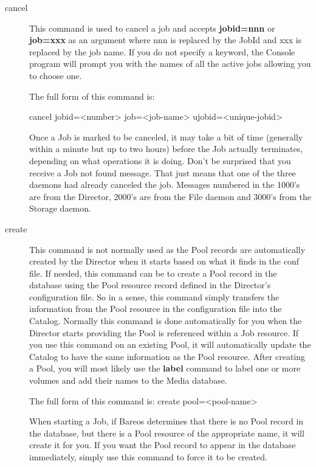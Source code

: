 \begin{description}
\item [cancel]
   This command is used to cancel a job and accepts {\bf jobid=nnn} or {\bf
   job=xxx} as an argument where nnn is replaced by the JobId and xxx is
   replaced by the job name.  If you do not specify a keyword, the Console
   program will prompt you with the names of all the active jobs allowing
   you to choose one.

   The full form of this command is:

cancel {\textlbrack}jobid={\textless}number{\textgreater} job={\textless}job-name{\textgreater}
  ujobid={\textless}unique-jobid{\textgreater}{\textrbrack}

   Once a Job is marked to be canceled, it may take a bit of time
   (generally within a minute but up to two hours) before the Job actually
   terminates, depending on what operations it is doing.
   Don't be surprised that you receive a Job not found message. That just
   means that one of the three daemons had already canceled the job.
   Messages numbered in the 1000's are from the Director, 2000's are from
   the File daemon and 3000's from the Storage daemon.

\item [create]
   This command is not normally used as the Pool records are automatically
   created by the Director when it starts based on what it finds in
   the conf file.  If needed, this command can be
   to create a Pool record in the database using the
   Pool resource record defined in the Director's configuration file.  So
   in a sense, this command simply transfers the information from the Pool
   resource in the configuration file into the Catalog.  Normally this
   command is done automatically for you when the Director starts providing
   the Pool is referenced within a Job resource.  If you use this command
   on an existing Pool, it will automatically update the Catalog to have
   the same information as the Pool resource.  After creating a Pool, you
   will most likely use the {\bf label} command to label one or more
   volumes and add their names to the Media database.

   The full form of this command is:
create {\textlbrack}pool={\textless}pool-name{\textgreater}{\textrbrack}

   When starting a Job, if Bareos determines that there is no Pool record
   in the database, but there is a Pool resource of the appropriate name,
   it will create it for you.  If you want the Pool record to appear in the
   database immediately, simply use this command to force it to be created.


\end{description}
